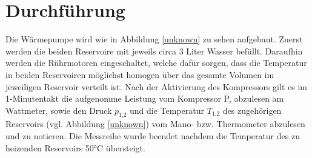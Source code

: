 \section{Durchführung}
    \label{sec:Durchführung}
    Die Wärmepumpe wird wie in Abbildung \ref {unknown} zu sehen aufgebaut. 
    Zuerst werden die beiden Reservoire mit jeweils circa 3 Liter Wasser befüllt.
    Daraufhin werden die Rührmotoren eingeschaltet, welche dafür sorgen,
    dass die Temperatur in beiden Reservoiren möglichst homogen über das gesamte Volumen im jeweiligen Reservoir verteilt ist.
    Nach der Aktivierung des Kompressors gilt es im 1-Minutentakt die aufgenomme Leistung vom Kompressor P, abzulesen am Wattmeter,
    sowie den Druck $p_\text{1,2}$ und die Temperatur $T_\text{1,2}$ des zugehörigen Reservoirs (vgl. Abbildung \ref {unknown})
    vom Mano- bzw. Thermometer abzulesen und zu notieren. Die Messreihe wurde beendet nachdem die Temperatur des zu heizenden Reservoirs 50°C übersteigt.